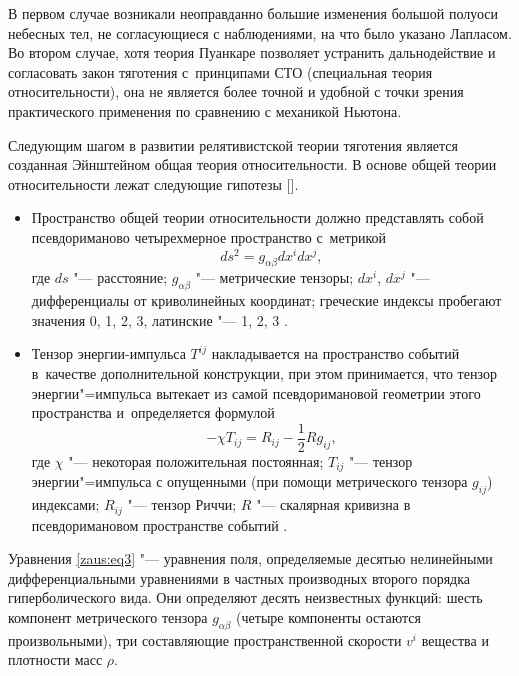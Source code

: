 В первом случае возникали неоправданно большие изменения большой полуоси небесных тел, не согласующиеся с наблюдениями, на что было указано Лапласом. Во втором случае, хотя теория Пуанкаре позволяет устранить дальнодействие и согласовать закон тяготения с~принципами СТО (специальная теория относительности), она не является более точной и удобной с точки зрения практического применения по сравнению с механикой Ньютона.

Следующим шагом в развитии релятивистской теории тяготения является созданная Эйнштейном общая теория относительности. В основе общей теории относительности лежат следующие гипотезы [].

\begin{itemize}
\item[I.] Пространство общей теории относительности должно представлять собой псевдориманово четырехмерное пространство с~метрикой
\begin{equation}
ds^2=g_{ \alpha \beta} dx^i dx^j, 
\label{zaus:eq2}
\end{equation}
где $ds$ "--- расстояние; 
$g_{ \alpha \beta}$ "--- метрические тензоры; 
$dx^i$, $dx^j$ "---  дифференциалы от криволинейных координат; 
греческие индексы пробегают значения 0, 1, 2, 3, латинские "--- 1, 2, 3 \cite[с.~33]{zaus:6}.

\item[II.] 
Тензор энергии-импульса $T^{ij}$ накладывается на пространство событий в~качестве дополнительной конструкции, при этом принимается, что тензор энергии"=импульса вытекает из самой псевдоримановой геометрии этого пространства и~определяется формулой
\begin{equation}
-\chi T_{ij} = R_{ij}-\frac{1}{2}R g_{ij},
\label{zaus:eq3}
\end{equation}
где $\chi$ "--- некоторая положительная постоянная; $T_{ij}$ "--- тензор энергии"=импульса с опущенными (при помощи метрического тензора $g_{ij}$) индексами; $R_{ij}$ "--- тензор Риччи; $R$ "--- скалярная кривизна в псевдоримановом пространстве событий 
\cite[с.~621]{zaus:pashevskiy}.


\end{itemize}

Уравнения \eqref{zaus:eq3} "--- уравнения поля, определяемые десятью нелинейными \linebreak дифференциальными уравнениями в частных производных второго порядка гиперболического вида. 
Они определяют десять неизвестных функций: шесть компонент метрического тензора $g_{ \alpha \beta}$ (четыре компоненты остаются произвольными), три составляющие пространственной скорости $v^i$ вещества и плотности масс $\rho$.


